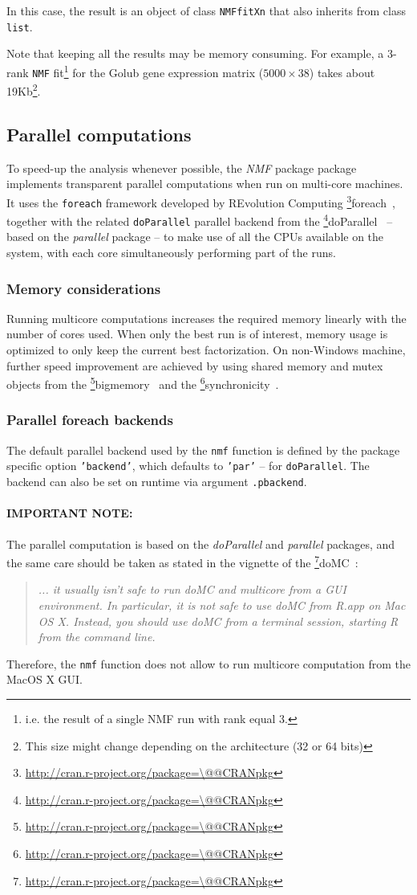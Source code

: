 \documentclass[a4paper]{article}\usepackage{graphicx, color}
\makeatletter
\let\code=\texttt
\newcommand{\pkgname}[1]{\textit{#1}\xspace}
\newcommand{\Rpkg}[1]{\pkgname{#1} package\xspace}
\newcommand{\CRANurl}[1]{\url{http://cran.r-project.org/package=#1}}
\def\CRANpkg{\@ifstar\@CRANpkg\@@CRANpkg}
\def\@CRANpkg#1{\href{http://cran.r-project.org/package=#1}{\pkgname{#1}}\footnote{\CRANurl{#1}}}
\def\@@CRANpkg#1{\href{http://cran.r-project.org/package=#1}{\pkgname{#1}} package\footnote{\CRANurl{#1}}}
\newcommand{\citeCRANpkg}[1]{\CRANpkg{#1}~\cite{#1}}
\newcommand{\nmfpack}{\Rpkg{NMF}}
\makeatother
\begin{document}
In this case, the result is an object of class \code{NMFfitXn} that also inherits from class \code{list}.

Note that keeping all the results may be memory consuming. 
For example, a 3-rank \code{NMF} fit\footnote{i.e. the result of a single NMF run with rank equal 3.} for the Golub gene expression matrix ($5000 \times 38$) takes about 19Kb\footnote{This size might change depending on the architecture (32 or 64 bits)}.

\subsection{Parallel computations}\label{multicore}

To speed-up the analysis whenever possible, the \nmfpack package implements transparent parallel computations when run on multi-core machines.
It uses the \code{foreach} framework developed by REvolution Computing
\citeCRANpkg{foreach}, together with the related \code{doParallel} parallel
backend from the \citeCRANpkg{doParallel} -- based on the
\pkgname{parallel} package -- to make use of all the CPUs available on the
system, with each core simultaneously performing part of the runs. 

\subsubsection{Memory considerations}
Running multicore computations increases the required memory linearly
with the number of cores used.
When only the best run is of interest, memory usage is
optimized to only keep the current best factorization.
On non-Windows machine, further speed improvement are achieved by using shared
memory and mutex objects from the \citeCRANpkg{bigmemory} and the 
\citeCRANpkg{synchronicity}.

\subsubsection{Parallel foreach backends}
The default parallel backend used by the \code{nmf} function is defined by the
package specific option \code{'backend'}, which defaults to \code{'par'} -- for
\code{doParallel}.
The backend can also be set on runtime via argument \code{.pbackend}.

\medskip
\paragraph{IMPORTANT NOTE:} 
The parallel computation is based on the \pkgname{doParallel} and
\pkgname{parallel} packages, and the same care should be taken as stated in the
vignette of the \citeCRANpkg{doMC}:
\begin{quote}
\emph{... it usually isn't safe to run doMC and multicore from a GUI environment. 
In particular, it is not safe to use doMC from R.app on Mac OS X. 
Instead, you should use doMC from a terminal session, starting R from the command line.}
\end{quote}
Therefore, the \code{nmf} function does not allow to run multicore computation from the 
MacOS X GUI.
\end{document}
